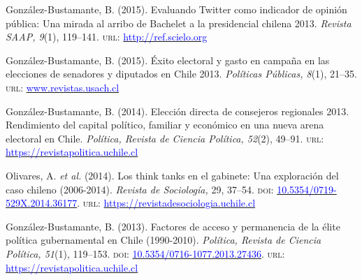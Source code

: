 \begin{publications}
\begin{benumerate}{12}
\item{\small Gonz\'alez-Bustamante, B. (2015). Evaluando Twitter como indicador de opinión pública: Una mirada al arribo de Bachelet a la presidencial chilena 2013. {\itshape Revista SAAP, 9}(1), 119--141. {\scshape url}: \href{http://ref.scielo.org/dwzhns}{\textcolor{blue}{http://ref.scielo.org}}} \vspace{1mm}

\item{\small Gonz\'alez-Bustamante, B. (2015). Éxito electoral y gasto en campaña en las elecciones de senadores y diputados en Chile 2013. {\itshape Pol\'iticas P\'ublicas, 8}(1), 21--35. {\scshape url}: \href{http://www.revistas.usach.cl/ojs/index.php/politicas/article/view/2182}{\textcolor{blue}{www.revistas.usach.cl}}} \vspace{1mm}

\item{\small Gonz\'alez-Bustamante, B. (2014). Elección directa de consejeros regionales 2013. Rendimiento del capital político, familiar y económico en una nueva arena electoral en Chile. {\itshape Pol\'itica, Revista de Ciencia Pol\'itica, 52}(2), 49--91. {\scshape url}: \href{https://revistapolitica.uchile.cl/index.php/RP/article/view/36137}{\textcolor{blue}{https://revistapolitica.uchile.cl}}} \vspace{1mm}

\item{\small Olivares, A. {\itshape et al.} (2014). Los think tanks en el gabinete: Una exploración del caso chileno (2006-2014). {\itshape Revista de Sociolog\'ia,} 29, 37--54. {\scshape doi}: \href{https://doi.org/10.5354/0719-529X.2014.36177}{\textcolor{blue}{10.5354/0719-529X.2014.36177}}. {\scshape url}: \href{https://revistadesociologia.uchile.cl/index.php/RDS/article/view/36177}{\textcolor{blue}{https://revistadesociologia.uchile.cl}}} \vspace{1mm}

\item{\small Gonz\'alez-Bustamante, B. (2013). Factores de acceso y permanencia de la élite política gubernamental en Chile (1990-2010). {\itshape Pol\'itica, Revista de Ciencia Pol\'itica, 51}(1), 119--153. {\scshape doi}: \href{https://doi.org/10.5354/0716-1077.2013.27436}{\textcolor{blue}{10.5354/0716-1077.2013.27436}}. {\scshape url}: \href{https://revistapolitica.uchile.cl/index.php/RP/article/view/27436}{\textcolor{blue}{https://revistapolitica.uchile.cl}}} \vspace{1mm}


\end{benumerate}
\end{publications}
